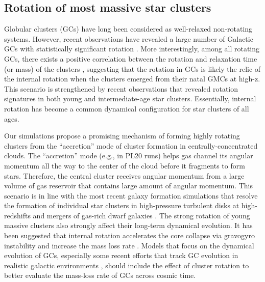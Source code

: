 \documentclass[fleqn,usenatbib]{mnras}
\begin{document}
\subsection{Rotation of most massive star clusters}
\label{sec:rotationOfClusters}

Globular clusters (GCs) have long been considered as well-relaxed non-rotating systems.
However, recent observations have revealed a large number of Galactic GCs with statistically significant rotation \citep[e.g.][]{bellazzini_na-o_2012, lardo_gaia_2015, bianchini_internal_2018, kamann_stellar_2018, ferraro_mikis_2018}.
More interestingly, among all rotating GCs, there exists a positive correlation between the rotation and relaxation time (or mass) of the clusters \citep{bianchini_internal_2018, kamann_stellar_2018}, suggesting that the rotation in GCs is likely the relic of the internal rotation when the clusters emerged from their natal GMCs at high-z.
This scenario is strengthened by recent observations that revealed rotation signatures in both young \citep{fischer_dynamics_1992, fischer_dynamics_1993, henault-brunet_vlt-flames_2012} and intermediate-age \citep{mackey_vlt/flames_2013, kamann_linking_2019} star clusters. Essentially, internal rotation has become a common dynamical configuration for star clusters of all ages.

Our simulations propose a promising mechanism of forming highly rotating clusters from the ``accretion'' mode of cluster formation in centrally-concentrated clouds.
The ``accretion'' mode (e.g., in PL20 runs) helps gas channel its angular momentum all the way to the center of the cloud before it fragments to form stars.
Therefore, the central cluster receives angular momentum from a large volume of gas reservoir that contains large amount of angular momentum.
This scenario is in line with the most recent galaxy formation simulations that resolve the formation of individual star clusters in high-pressure turbulent disks at high-redshifts \citep{ma_self-consistent_2020} and mergers of gas-rich dwarf galaxies \citep{lahen_griffin_2020}.
The strong rotation of young massive clusters also strongly affect their long-term dynamical evolution. It has been suggested that internal rotation accelerates the core collapse via gravogyro instability and increase the mass loss rate \cite[e.g.][]{einsel_dynamical_1999, ernst_n_2007, tiongco_complex_2018}. Models that focus on the dynamical evolution of GCs, especially some recent efforts that track GC evolution in realistic galactic environments \citep[e.g.][]{li_star_2017, pfeffer_e-mosaics_2018, li_star_2019}, should include the effect of cluster rotation to better evaluate the mass-loss rate of GCs across cosmic time. 
\end{document}
